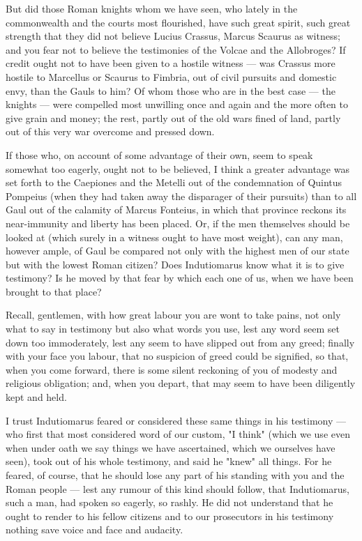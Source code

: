  But did those Roman knights whom we have seen, who lately in the commonwealth and the courts most flourished, have such great spirit, such great strength that they did not believe Lucius Crassus, Marcus Scaurus as witness; and you fear not to believe the testimonies of the Volcae and the Allobroges? If credit ought not to have been given to a hostile witness --- was Crassus more hostile to Marcellus or Scaurus to Fimbria, out of civil pursuits and domestic envy, than the Gauls to him? Of whom those who are in the best case --- the knights --- were compelled most unwilling once and again and the more often to give grain and money; the rest, partly out of the old wars fined of land, partly out of this very war overcome and pressed down.

 If those who, on account of some advantage of their own, seem to speak somewhat too eagerly, ought not to be believed, I think a greater advantage was set forth to the Caepiones and the Metelli out of the condemnation of Quintus Pompeius (when they had taken away the disparager of their pursuits) than to all Gaul out of the calamity of Marcus Fonteius, in which that province reckons its near-immunity and liberty has been placed. Or, if the men themselves should be looked at (which surely in a witness ought to have most weight), can any man, however ample, of Gaul be compared not only with the highest men of our state but with the lowest Roman citizen? Does Indutiomarus know what it is to give testimony? Is he moved by that fear by which each one of us, when we have been brought to that place?

 Recall, gentlemen, with how great labour you are wont to take pains, not only what to say in testimony but also what words you use, lest any word seem set down too immoderately, lest any seem to have slipped out from any greed; finally with your face you labour, that no suspicion of greed could be signified, so that, when you come forward, there is some silent reckoning of you of modesty and religious obligation; and, when you depart, that may seem to have been diligently kept and held.

 I trust Indutiomarus feared or considered these same things in his testimony --- who first that most considered word of our custom, "I think" (which we use even when under oath we say things we have ascertained, which we ourselves have seen), took out of his whole testimony, and said he "knew" all things. For he feared, of course, that he should lose any part of his standing with you and the Roman people --- lest any rumour of this kind should follow, that Indutiomarus, such a man, had spoken so eagerly, so rashly. He did not understand that he ought to render to his fellow citizens and to our prosecutors in his testimony nothing save voice and face and audacity.

